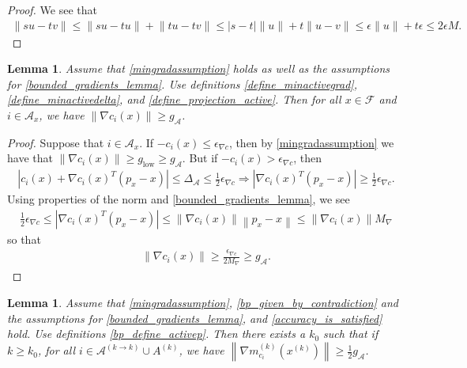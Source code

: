 \documentclass{article}
\newtheorem{lemma}[theorem]{Lemma}
\theoremstyle{case}
\numberwithin{theorem}{subsection}
\newcommand{\feasible}{{\mathcal F}}
\newcommand{\gmcik}{{\nabla m_{c_i}^{(k)}\left(\xk\right)}}
\newcommand{\maxgrad}{{M_{\nabla}}}
\newcommand{\minactivegraddelta}{{\Delta_{\mathcal A}}}
\newcommand{\minactivegrad}{{ g_{\mathcal A} }}
\newcommand{\mingradepsilon}{{\epsilon_{\nabla c}}}
\newcommand{\mingrad}{{ g_{\textrm{low}} }}
\newcommand{\xk}{{x^{(k)}}}
\begin{document}
\begin{proof}
We see that
\begin{align}
\bigg\|su - tv\bigg\| \le \bigg\|su - tu\bigg\| + \bigg\|tu- tv\bigg\| \le |s - t| \|u\| + t \|u - v\| \le \epsilon \|u\| + t \epsilon \le 2 \epsilon M.
\end{align}
\end{proof}




\begin{lemma}
\label{min_active_gradient_lemma}
Assume that \cref{mingradassumption} holds as well as the assumptions for \cref{bounded_gradients_lemma}.
Use definitions \cref{define_minactivegrad}, \cref{define_minactivedelta}, and \cref{define_projection_active}.
Then for all $x \in \feasible$ and $i \in \mathcal A_x$, we have $\left\|\nabla c_i(x)\right\| \ge \minactivegrad$.
\end{lemma}

\begin{proof}
Suppose that $i \in \mathcal A_x$.
If $-c_i(x) \le \mingradepsilon$, then by \cref{mingradassumption} we have that $\|\nabla c_i(x)\| \ge \mingrad \ge \minactivegrad$.
But if $-c_i(x) > \mingradepsilon$, then
\begin{align*}
\left|c_i(x) + \nabla c_i(x)^T(p_x - x)\right| \le \minactivegraddelta \le \frac 1 2 \mingradepsilon
\Longrightarrow \left|\nabla c_i(x)^T(p_x - x)\right| \ge \frac 1 2 \mingradepsilon.
\end{align*}
Using properties of the norm and \cref{bounded_gradients_lemma}, we see
\begin{align*}
\frac 1 2 \mingradepsilon \le \left|\nabla c_i(x)^T(p_x - x)\right| \le \left\|\nabla c_i(x)\right\|\left\|p_x - x\right\| \le \left\|\nabla c_i(x)\right\| \maxgrad
\end{align*}
so that 
\begin{align*}
\left\|\nabla c_i(x)\right\| \ge \frac {\mingradepsilon} {2 \maxgrad} \ge \minactivegrad.
\end{align*}
\end{proof}




\begin{lemma}
\label{min_active_model_gradient_lemma}
Assume that
\cref{mingradassumption}, \cref{bp_given_by_contradiction}
and the assumptions for
\cref{bounded_gradients_lemma}, and \cref{accuracy_is_satisfied} hold.
Use definitions \cref{bp_define_activep}.
Then there exists a $k_0$ such that if $k \ge k_0$,
for all $i \in \mathcal A^{(k\to k)} \cup A^{(k)}$, we have $\left\|\gmcik\right\| \ge \frac 1 2 \minactivegrad$.
\end{lemma}
\end{document}
